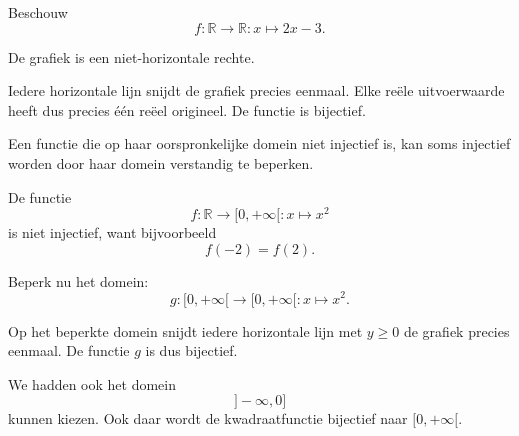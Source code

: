 \documentclass{ximera}
\begin{document}
\begin{voorbeeld}

Beschouw
\[
f:\mathbb R\to\mathbb R:x\mapsto 2x-3.
\]

De grafiek is een niet-horizontale rechte.

\begin{center}
\end{center}

Iedere horizontale lijn snijdt de grafiek precies eenmaal.
Elke reële uitvoerwaarde heeft dus precies één reëel origineel.
De functie is bijectief.
\end{voorbeeld}



Een functie die op haar oorspronkelijke domein niet injectief is,
kan soms injectief worden door haar domein verstandig te beperken.

\begin{voorbeeld}[De kwadraatfunctie]

De functie
\[
f:\mathbb R\to[0,+\infty[:x\mapsto x^2
\]
is niet injectief, want bijvoorbeeld
\[
f(-2)=f(2).
\]

Beperk nu het domein:
\[
g:[0,+\infty[\to[0,+\infty[:x\mapsto x^2.
\]

\begin{center}
\end{center}

Op het beperkte domein snijdt iedere horizontale lijn met \(y\geq0\)
de grafiek precies eenmaal. De functie \(g\) is dus bijectief.

We hadden ook het domein
\[
]-\infty,0]
\]
kunnen kiezen. Ook daar wordt de kwadraatfunctie bijectief naar
\([0,+\infty[\).
\end{voorbeeld}
\end{document}
